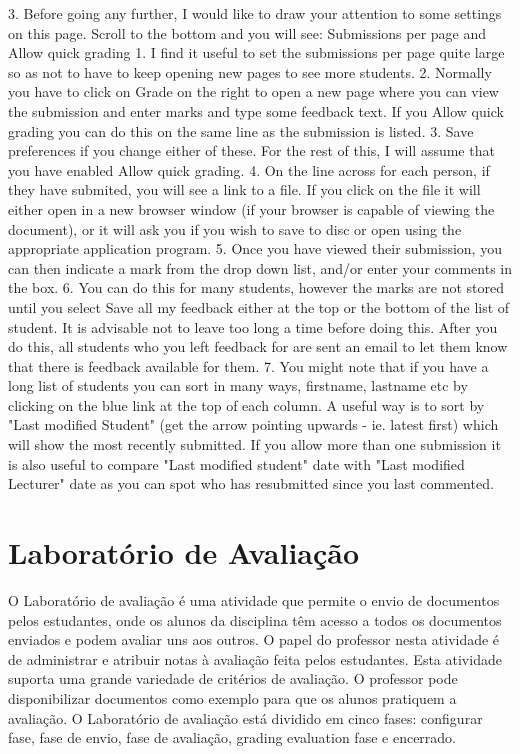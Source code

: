    3. Before going any further, I would like to draw your attention to some settings on this page. Scroll to the bottom and you will see: Submissions per page and Allow quick grading
         1. I find it useful to set the submissions per page quite large so as not to have to keep opening new pages to see more students.
         2. Normally you have to click on Grade on the right to open a new page where you can view the submission and enter marks and type some feedback text. If you Allow quick grading you can do this on the same line as the submission is listed.
         3. Save preferences if you change either of these. For the rest of this, I will assume that you have enabled Allow quick grading.
   4. On the line across for each person, if they have submited, you will see a link to a file. If you click on the file it will either open in a new browser window (if your browser is capable of viewing the document), or it will ask you if you wish to save to disc or open using the appropriate application program.
   5. Once you have viewed their submission, you can then indicate a mark from the drop down list, and/or enter your comments in the box.
   6. You can do this for many students, however the marks are not stored until you select Save all my feedback either at the top or the bottom of the list of student. It is advisable not to leave too long a time before doing this. After you do this, all students who you left feedback for are sent an email to let them know that there is feedback available for them.
   7. You might note that if you have a long list of students you can sort in many ways, firstname, lastname etc by clicking on the blue link at the top of each column. A useful way is to sort by "Last modified Student" (get the arrow pointing upwards - ie. latest first) which will show the most recently submitted. If you allow more than one submission it is also useful to compare "Last modified student" date with "Last modified Lecturer" date as you can spot who has resubmitted since you last commented.
\section{Laboratório de Avaliação}
O Laboratório de avaliação é uma atividade que permite o envio de documentos pelos estudantes, onde os alunos da disciplina têm acesso a todos os documentos enviados e podem avaliar uns aos outros. O papel do professor nesta atividade é de administrar e atribuir notas à avaliação feita pelos estudantes. Esta atividade suporta uma grande variedade de critérios de avaliação. O professor pode disponibilizar documentos como exemplo para que os alunos pratiquem a avaliação. O Laboratório de avaliação está dividido em cinco fases: configurar fase, fase de envio, fase de avaliação, grading evaluation fase e encerrado.
